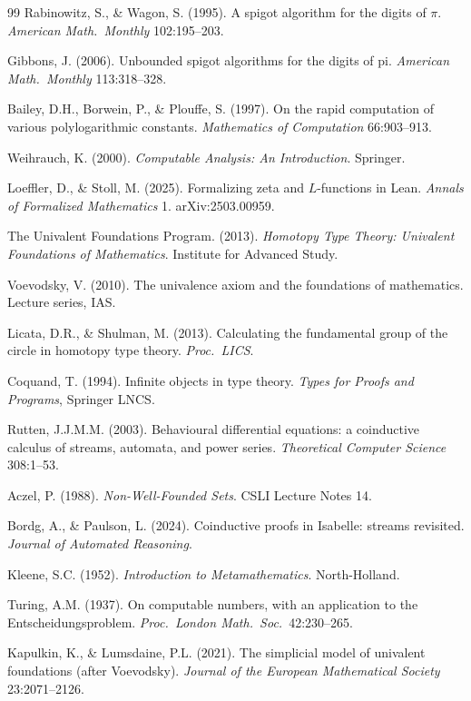 \documentclass[12pt]{article}
\theoremstyle{definition}
\theoremstyle{remark}
\begin{document}
\begin{thebibliography}{99}
Rabinowitz, S., \& Wagon, S. (1995). A spigot algorithm for the
digits of $\pi$. \emph{American Math.\ Monthly} 102:195--203.

Gibbons, J. (2006). Unbounded spigot algorithms for the digits
of pi. \emph{American Math.\ Monthly} 113:318--328.

Bailey, D.H., Borwein, P., \& Plouffe, S. (1997). On the rapid
computation of various polylogarithmic constants.
\emph{Mathematics of Computation} 66:903--913.

Weihrauch, K. (2000). \emph{Computable Analysis: An Introduction}.
Springer.

Loeffler, D., \& Stoll, M. (2025). Formalizing zeta and
$L$-functions in Lean. \emph{Annals of Formalized Mathematics} 1.
arXiv:2503.00959.

The Univalent Foundations Program. (2013). \emph{Homotopy Type
Theory: Univalent Foundations of Mathematics}. Institute for
Advanced Study.

Voevodsky, V. (2010). The univalence axiom and the
foundations of mathematics. Lecture series, IAS.

Licata, D.R., \& Shulman, M. (2013). Calculating the fundamental
group of the circle in homotopy type theory. \emph{Proc.\ LICS}.

Coquand, T. (1994). Infinite objects in type theory. \emph{Types
for Proofs and Programs}, Springer LNCS.

Rutten, J.J.M.M. (2003). Behavioural differential equations: a
coinductive calculus of streams, automata, and power series.
\emph{Theoretical Computer Science} 308:1--53.

Aczel, P. (1988). \emph{Non-Well-Founded Sets}. CSLI Lecture
Notes 14.

Bordg, A., \& Paulson, L. (2024). Coinductive proofs in Isabelle:
streams revisited. \emph{Journal of Automated Reasoning}.

Kleene, S.C. (1952). \emph{Introduction to Metamathematics}.
North-Holland.

Turing, A.M. (1937). On computable numbers, with an application
to the Entscheidungsproblem. \emph{Proc.\ London Math.\ Soc.}\ 42:230--265.

Kapulkin, K., \& Lumsdaine, P.L. (2021). The simplicial model of
univalent foundations (after Voevodsky). \emph{Journal of the
European Mathematical Society} 23:2071--2126.


\end{thebibliography}
\end{document}
